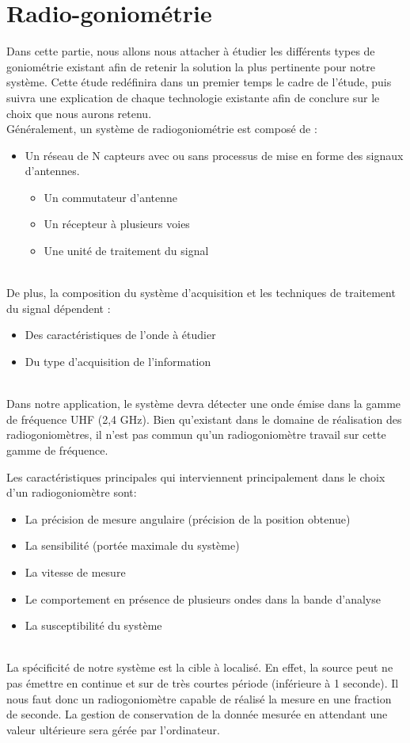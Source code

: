 \chapter{Radio-goniométrie}



Dans cette partie, nous allons nous attacher à étudier les différents types de goniométrie existant afin de retenir la solution la plus pertinente pour notre système. Cette étude redéfinira dans un premier temps le cadre de l’étude, puis suivra une explication de chaque technologie existante afin de conclure sur le choix que nous aurons retenu.
~\\

Généralement, un système de radiogoniométrie est composé de  :

\begin{itemize}
\item Un réseau de N capteurs avec ou sans processus de mise en forme des signaux d’antennes.
  \begin{itemize}	
  \item Un commutateur d’antenne
  \item Un récepteur à plusieurs voies
  \item Une unité de traitement du signal
  \end{itemize}
\end{itemize}
~\\
De plus, la composition du système d’acquisition et les techniques de traitement du signal dépendent :
\begin{itemize}
\item  Des caractéristiques de l’onde à étudier
\item  Du type d’acquisition de l’information
\end{itemize}
~\\
Dans notre application, le système devra détecter une onde émise dans la gamme de fréquence UHF (2,4 GHz). Bien qu’existant dans le domaine de réalisation des radiogoniomètres, il n’est pas commun qu’un radiogoniomètre travail sur cette gamme de fréquence.

Les caractéristiques principales qui interviennent principalement dans le choix d’un radiogoniomètre sont:

\begin{itemize}
\item La précision de mesure angulaire (précision de la position obtenue)
\item La sensibilité (portée maximale du système) 
\item La vitesse de mesure
\item Le comportement en présence de plusieurs ondes dans la bande d’analyse
\item La susceptibilité du système
\end{itemize}
~\\
La spécificité de notre système est la cible à localisé. En effet, la source peut ne pas émettre en  continue et sur de très courtes période (inférieure à 1 seconde). Il nous faut donc un radiogoniomètre capable de réalisé la mesure en une fraction de seconde. La gestion de conservation de la donnée mesurée en attendant une valeur ultérieure sera gérée par l’ordinateur.


